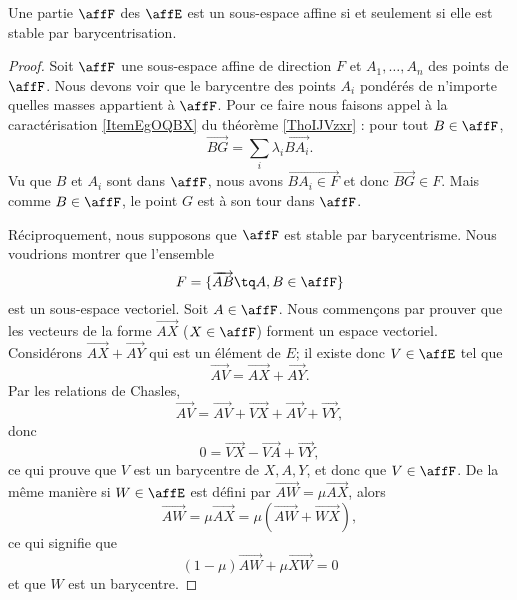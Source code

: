 \begin{proposition}
    Une partie \( \affF\) des \( \affE\) est un sous-espace affine si et seulement si elle est stable par barycentrisation.
\end{proposition}

\begin{proof}
    Soit \( \affF\) une sous-espace affine de direction \( F\) et \( A_1,\ldots, A_n\) des points de \( \affF\). Nous devons voir que le barycentre des points \( A_i\) pondérés de n'importe quelles masses appartient à \( \affF\). Pour ce faire nous faisons appel à la caractérisation \ref{ItemEgOQBX} du théorème \ref{ThoIJVzxr} : pour tout \( B\in\affF\), 
    \begin{equation}
        \overrightarrow{ BG }=\sum_i\lambda_i\overrightarrow{ BA_i }.
    \end{equation}
    Vu que \( B\) et \( A_i\) sont dans \( \affF\), nous avons \( \overrightarrow{ BA_i\in F }\) et donc \( \overrightarrow{ BG }\in F\). Mais comme \( B\in\affF\), le point \( G\) est à son tour dans \( \affF\).

    Réciproquement, nous supposons que \( \affF\) est stable par barycentrisme. Nous voudrions montrer que l'ensemble
    \begin{equation}        \label{EqCmyWGi}
        F=\{ \overrightarrow{ AB }\tq A,B\in \affF \}
    \end{equation}
    est un sous-espace vectoriel. Soit \( A\in\affF\). Nous commençons par prouver que les vecteurs de la forme \( \overrightarrow{ AX }\) (\( X\in \affF\)) forment un espace vectoriel. Considérons \( \overrightarrow{ AX }+\overrightarrow{ AY }\) qui est un élément de \( E\); il existe donc \( V\in \affE\) tel que
    \begin{equation}
        \overrightarrow{ AV }=\overrightarrow{ AX }+\overrightarrow{ AY }.
    \end{equation}
    Par les relations de Chasles,
    \begin{equation}
        \overrightarrow{ AV }=\overrightarrow{ AV }+\overrightarrow{ VX }+\overrightarrow{ AV }+\overrightarrow{ VY },
    \end{equation}
    donc
    \begin{equation}
        0=\overrightarrow{ VX }-\overrightarrow{ VA }+\overrightarrow{ VY },
    \end{equation}
    ce qui prouve que \( V\) est un barycentre de \( X,A,Y\), et donc que \( V\in\affF\). De la même manière si \( W\in \affE\) est défini par \( \overrightarrow{ AW }=\mu \overrightarrow{ AX }\), alors
    \begin{equation}
        \overrightarrow{ AW }=\mu\overrightarrow{ AX }=\mu(\overrightarrow{ AW }+\overrightarrow{ WX }),
    \end{equation}
    ce qui signifie que
    \begin{equation}
        (1-\mu)\overrightarrow{ AW }+\mu\overrightarrow{ XW }=0
    \end{equation}
    et que \( W\) est un barycentre.


\end{proof}
